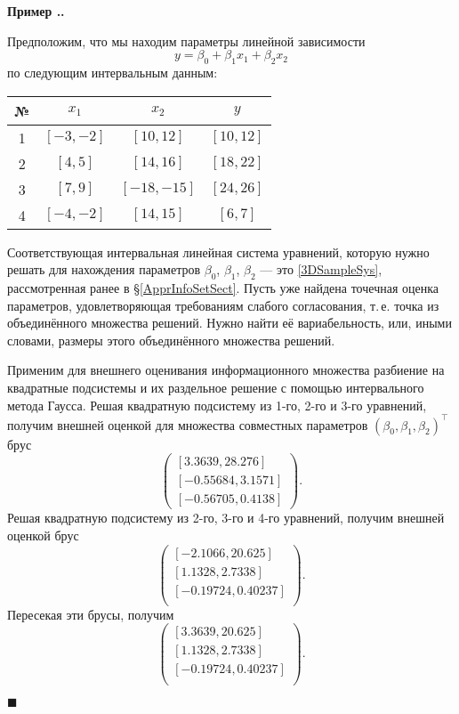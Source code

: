 \documentclass[a5paper,openany]{book}
\newcounter{ExmpNum}[section]
\renewcommand{\theExmpNum}{\thesection.\arabic{ExmpNum}}
\newenvironment{example}%
  {\refstepcounter{ExmpNum}%
  \par\addvspace{\medskipamount} 
  \noindent\textbf{Пример {\theExmpNum}.}
  }%
  {\hfill$\blacksquare$\par\medskip}
\begin{document}
\begin{example} 
Предположим, что мы находим параметры линейной зависимости 
\begin{equation*} 
y = \beta_{0} + \beta_{1}x_{1} + \beta_{2}x_{2}
\end{equation*} 
по следующим интервальным данным: 
\begin{center} 
\tabcolsep=3mm
\begin{tabular}{|c||cc|c|}  
\hline 
№ & $x_1$ & $x_2$ & $y$ \\ 
\hline\hline \rule{0mm}{4mm}%
1 & $[-3, -2]$ &  $[10, 12]$  & $[10, 12]$ \\[3pt] 
2 &  $[4, 5]$  &  $[14, 16]$  & $[18, 22]$ \\[3pt] 
3 &  $[7, 9]$  & $[-18, -15]$ & $[24, 26]$ \\[3pt] 
4 & $[-4, -2]$ &  $[14, 15]$  &  $[6, 7]$%
\rule[-2mm]{0mm}{4mm} \\ 
\hline 
\end{tabular} 
\end{center}   
Соответствующая интервальная линейная система уравнений, которую нужно решать 
для нахождения параметров $\beta_0$, $\beta_1$, $\beta_2$ --- это \eqref{3DSampleSys}, 
рассмотренная ранее в \S\ref{ApprInfoSetSect}. Пусть уже найдена точечная оценка 
параметров, удовлетворяющая требованиям слабого согласования, т.\,е. точка из 
объединённого множества решений. Нужно найти её вариабельность, или, иными словами, 
размеры этого объединённого множества решений. 
  
Применим для внешнего оценивания информационного множества разбиение на квадратные 
подсистемы и их раздельное решение с помощью интервального метода Гаусса. Решая 
квадратную подсистему из 1-го, 2-го и 3-го уравнений, получим внешней оценкой 
для множества совместных параметров $(\beta_{0}, \beta_{1}, \beta_{2})^\top$ брус 
\begin{equation*} 
\begin{pmatrix} 
[3.3639, 28.276]   \\ 
[-0.55684, 3.1571] \\ 
[-0.56705, 0.4138] 
\end{pmatrix}.  
\end{equation*} 
Решая квадратную подсистему из 2-го, 3-го и 4-го уравнений, получим внешней 
оценкой брус 
\begin{equation*} 
\begin{pmatrix} 
[-2.1066,  20.625] \\ 
[ 1.1328,  2.7338] \\
[-0.19724, 0.40237]\\
\end{pmatrix}.  
\end{equation*} 
Пересекая эти брусы, получим 
\begin{equation} 
\label{IsectRes} 
\begin{pmatrix} 
[3.3639, 20.625] \\ 
[ 1.1328,  2.7338] \\
[-0.19724, 0.40237]\\
\end{pmatrix}.  
\end{equation} 
  

\end{example}
\end{document}
